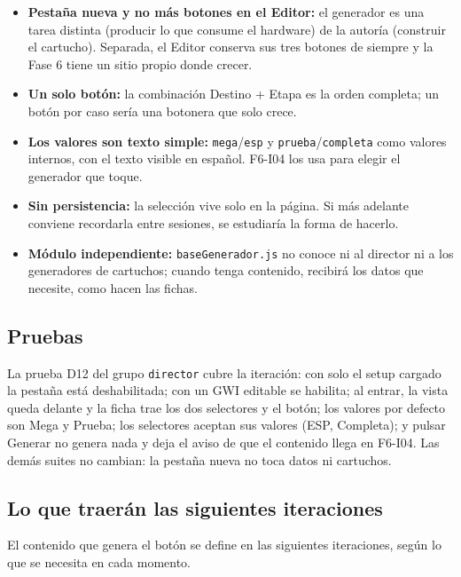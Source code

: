 \begin{itemize}
	\item \textbf{Pestaña nueva y no más botones en el Editor:} el generador es una tarea distinta (producir lo que consume el hardware) de la autoría (construir el cartucho). Separada, el Editor conserva sus tres botones de siempre y la Fase 6 tiene un sitio propio donde crecer.
	\item \textbf{Un solo botón:} la combinación Destino + Etapa es la orden completa; un botón por caso sería una botonera que solo crece.
	\item \textbf{Los valores son texto simple:} \texttt{mega}/\texttt{esp} y \texttt{prueba}/\texttt{completa} como valores internos, con el texto visible en español. F6-I04 los usa para elegir el generador que toque.
	\item \textbf{Sin persistencia:} la selección vive solo en la página. Si más adelante conviene recordarla entre sesiones, se estudiaría la forma de hacerlo.
	\item \textbf{Módulo independiente:} \texttt{baseGenerador.js} no conoce ni al director ni a los generadores de cartuchos; cuando tenga contenido, recibirá los datos que necesite, como hacen las fichas.
\end{itemize}

\subsection{Pruebas}
\label{sec:F6I03Pruebas}

La prueba D12 del grupo \texttt{director} cubre la iteración: con solo el setup cargado la pestaña está deshabilitada; con un GWI editable se habilita; al entrar, la vista queda delante y la ficha trae los dos selectores y el botón; los valores por defecto son Mega y Prueba; los selectores aceptan sus valores (ESP, Completa); y pulsar Generar no genera nada y deja el aviso de que el contenido llega en F6-I04. Las demás suites no cambian: la pestaña nueva no toca datos ni cartuchos.

\subsection{Lo que traerán las siguientes iteraciones}
\label{sec:F6I03Siguiente}

El contenido que genera el botón se define en las siguientes iteraciones, según lo que se necesita en cada momento.
